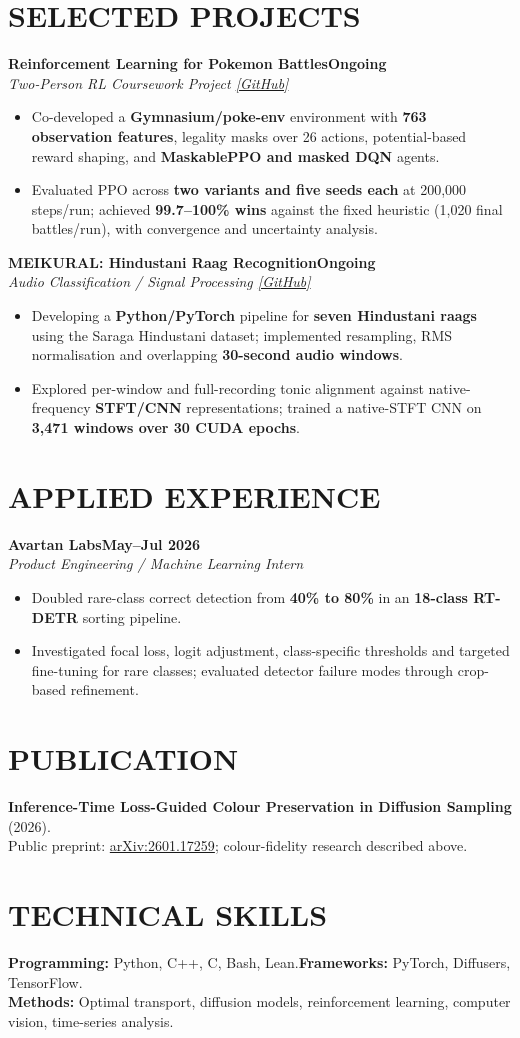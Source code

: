 \documentclass[10pt,a4paper]{article}
\newcommand{\entry}[3]{\noindent\textbf{#1}\hfill\textbf{#3}\\[-1pt]\textit{#2}\par}
\newenvironment{cvitems}{\begin{itemize}[leftmargin=1.1em,label=\textbullet,itemsep=2pt,topsep=3pt,parsep=0pt,partopsep=0pt]}{\end{itemize}}
\begin{document}
\section{SELECTED PROJECTS}
\entry{Reinforcement Learning for Pokemon Battles}{Two-Person RL Coursework Project \href{https://github.com/Kabir1607/RL_MidSem_Kabir_Aarush}{[GitHub]}}{Ongoing}
\begin{cvitems}
  \item Co-developed a \textbf{Gymnasium/poke-env} environment with \textbf{763 observation features}, legality masks over 26 actions, potential-based reward shaping, and \textbf{MaskablePPO and masked DQN} agents.
  \item Evaluated PPO across \textbf{two variants and five seeds each} at 200,000 steps/run; achieved \textbf{99.7--100\% wins} against the fixed heuristic (1,020 final battles/run), with convergence and uncertainty analysis.
\end{cvitems}
\entry{MEIKURAL: Hindustani Raag Recognition}{Audio Classification / Signal Processing \href{https://github.com/MushuRam01/MEIKURAL}{[GitHub]}}{Ongoing}
\begin{cvitems}
  \item Developing a \textbf{Python/PyTorch} pipeline for \textbf{seven Hindustani raags} using the Saraga Hindustani dataset; implemented resampling, RMS normalisation and overlapping \textbf{30-second audio windows}.
  \item Explored per-window and full-recording tonic alignment against native-frequency \textbf{STFT/CNN} representations; trained a native-STFT CNN on \textbf{3,471 windows over 30 CUDA epochs}.
\end{cvitems}
\section{APPLIED EXPERIENCE}
\entry{Avartan Labs}{Product Engineering / Machine Learning Intern}{May--Jul 2026}
\begin{cvitems}
  \item Doubled rare-class correct detection from \textbf{40\% to 80\%} in an \textbf{18-class RT-DETR} sorting pipeline.
  \item Investigated focal loss, logit adjustment, class-specific thresholds and targeted fine-tuning for rare classes; evaluated detector failure modes through crop-based refinement.
\end{cvitems}
\section{PUBLICATION}
\textbf{Inference-Time Loss-Guided Colour Preservation in Diffusion Sampling} (2026).\\
Public preprint: \href{https://arxiv.org/abs/2601.17259}{arXiv:2601.17259}; colour-fidelity research described above.
\section{TECHNICAL SKILLS}
\textbf{Programming:} Python, C++, C, Bash, Lean.\quad \textbf{Frameworks:} PyTorch, Diffusers, TensorFlow.\\\textbf{Methods:} Optimal transport, diffusion models, reinforcement learning, computer vision, time-series analysis.
\end{document}
